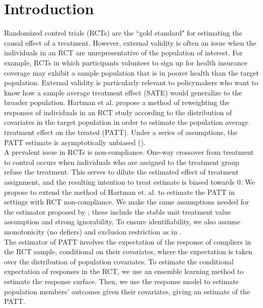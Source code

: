 \documentclass[12pt]{article}
\begin{document}
    
\maketitle  


\vspace{20mm}

\section{Introduction}
Randomized control trials (RCTs) are the ``gold standard" for estimating the causal effect of a treatment.  However, external validity is often an issue when the individuals in an RCT are unrepresentative of the population of interest.  For example, RCTs in which participants volunteer to sign up for health insurance coverage may exhibit a sample population that is in poorer health than the target population.  External validity is particularly relevant to policymakers who want to know how a sample average treatment effect (SATE) would generalize to the broader population. Hartman et al. propose a method of reweighting the responses of individuals in an RCT study according to the distribution of covariates in the target population in order to estimate the population average treatment effect on the treated (PATT).  Under a series of assumptions, the PATT estimate is asymptotically unbiased (\cite{Hartman}). \\

A prevalent issue in RCTs is non-compliance.  One-way crossover from treatment to control occurs when individuals who are assigned to the treatment group refuse the treatment.  This serves to dilute the estimated effect of treatment assignment, and the resulting intention to treat estimate is biased towards $0$.  We propose to extend the method of Hartman et. al. to estimate the PATT in settings with RCT non-compliance.  We make the same assumptions needed for the estimator proposed by \cite{Hartman}; these include the stable unit treatment value assumption and strong ignorability.  To ensure identifiability, we also assume monotonicity (no defiers) and exclusion restriction as in \cite{Angrist1996}. \\

The estimator of PATT involves the expectation of the response of compliers in the RCT sample, conditional on their covariates, where the expectation is taken over the distribution of population covariates.  To estimate the conditional expectation of responses in the RCT, we use an ensemble learning method to estimate the response surface.  Then, we use the response model to estimate population members' outcomes given their covariates, giving an estimate of the PATT. \\
\end{document}
